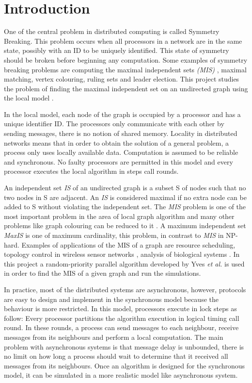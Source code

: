 \section{Introduction}
\label{cap:1}

 One of the central problem in distributed computing is called Symmetry Breaking. This problem occurs when all processors in a network are in the same state, possibly with an ID to be uniquely identified. This state of symmetry should be broken before beginning any computation. Some examples of symmetry breaking problems are computing the maximal independent sets \textit{(MIS)} , maximal matching, vertex colouring, ruling sets and leader election. This project studies the problem of finding the maximal independent set on an undirected graph using the local model \cite{linial1992locality}.

In the local model, each node of the graph is occupied by a processor and has a unique identifier ID. The processors only communicate with each other by sending messages, there is no notion of shared memory. Locality in distributed networks means that in order to obtain the solution of a general problem, a process only uses locally available data. Computation is assumed to be reliable and synchronous. No faulty processors are permitted in this model and every processor executes the local algorithm in steps call rounds.

An independent set \textit{IS} of an undirected graph is a subset S of nodes such that no two nodes in S are adjacent. An \textit{IS} is considered maximal if no extra node can be added to S without violating the independent set. The \textit{MIS} problem is one of the most important problem in the area of local graph algorithm and many other problems like graph colouring can be reduced to it \cite{panconesi1992improved}. A maximum independent set \textit{MaxIS} is one of maximum cardinality, this problem, in contrast to \textit{MIS} in NP-hard. Examples of applications of the MIS of a graph are resource scheduling, topology control in wireless sensor networks \cite{basagni2001finding}, analysis of biological systems \cite{afek2013beeping}. In this project a random-priority parallel algorithm developed by Yves \textit{et al.} \cite{yves2009optimal} is used in order to find the MIS of a given graph and run the simulations.


In practice, most of the distributed systems are asynchronous, however, protocols are easy to design and implement in the synchronous model because the behaviour is more restricted. In this model, processors execute in lock steps as follow: Every processor partitions the algorithm execution in logical timing call round. In these rounds, a process can send messages to each neighbour, receive messages from its neighbours and perform a local computation. The main problem with asynchronous systems is that message delay is unbounded, there is no limit on how long a process should wait to determine that it received all messages from its neighbours. Once an algorithm is designed for the synchronous model, it can be simulated in a more realistic model like asynchronous system. 



